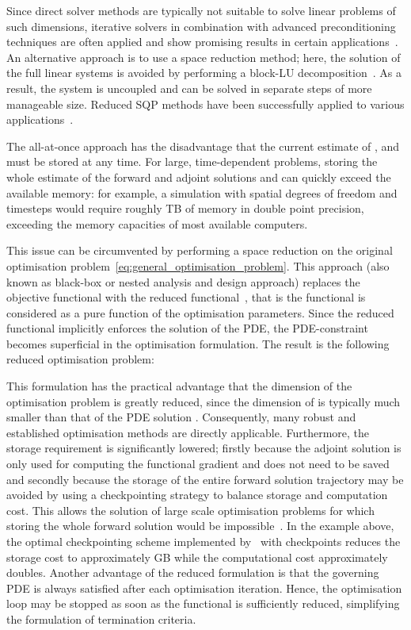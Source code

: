 \documentclass[prodmode,acmtoms]{acmsmall}
\begin{document}
Since direct solver methods are typically not suitable to solve linear problems of such dimensions, 
iterative solvers in combination with advanced preconditioning techniques are often applied and show promising results in certain applications~\cite{battermann2001,biros2000,schoeberl2007}.
An alternative approach is to use a space reduction method; here, the solution of the full linear systems is avoided 
by performing a block-LU decomposition~\cite{byrd1991,biegler1995,schulz1998}. 
As a result, the system is uncoupled and can be solved in separate steps of more manageable size.
Reduced SQP methods have been successfully applied to various applications~\cite{kupfer1992,orozco1992,orozco1997}. 


The all-at-once approach has the disadvantage that the current estimate of ,  and  must be stored at any time. 
For large, time-dependent problems, storing the whole estimate of the forward and adjoint solutions  and  can quickly exceed the available memory:
for example, a simulation with  spatial degrees of freedom and  timesteps would require roughly  TB of memory in double point precision, 
exceeding the memory capacities of most available computers.

This issue can be circumvented by performing a space reduction on the original optimisation problem~\eqref{eq:general_optimisation_problem}.
This approach (also known as black-box or nested analysis and design approach) replaces the objective functional  with the reduced functional~, 
that is the functional is considered as a pure function of the optimisation parameters.
Since the reduced functional implicitly enforces the solution of the PDE, the PDE-constraint becomes superficial in the optimisation formulation.
The result is the following {reduced optimisation problem}:


This formulation has the practical advantage that the dimension of the optimisation problem is greatly reduced, 
since the dimension of  is typically much smaller than that of the PDE solution . 
Consequently, many robust and established optimisation methods are directly applicable.
Furthermore, the storage requirement is significantly lowered;
firstly because the adjoint solution is only used for computing the functional gradient and does not need to be saved and
secondly because the storage of the entire forward solution trajectory may be avoided by using a checkpointing strategy to balance storage and computation cost. 
This allows the solution of large scale optimisation problems for which storing the whole forward solution would be impossible~\cite{griewank1992}.
In the example above, the optimal checkpointing scheme implemented by~ with  checkpoints reduces the storage cost to approximately  GB 
while the computational cost approximately doubles.
Another advantage of the reduced formulation is that the governing PDE is always satisfied after each optimisation iteration.
Hence, the optimisation loop may be stopped as soon as the functional is sufficiently reduced, simplifying the formulation of termination criteria.
\end{document}
